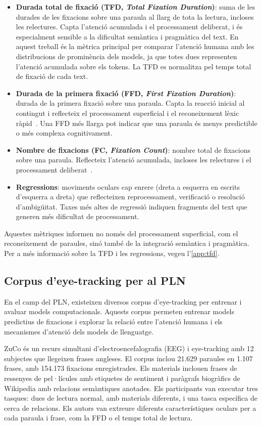 \begin{itemize}
    \item \textbf{Durada total de fixació (TFD, \textit{Total Fixation Duration})}: suma de les durades de les fixacions sobre una paraula al llarg de tota la lectura, incloses les relectures. Capta l'atenció acumulada i el processament deliberat, i és especialment sensible a la dificultat semàntica i pragmàtica del text. En aquest treball és la mètrica principal per comparar l'atenció humana amb les distribucions de prominència dels models, ja que totes dues representen l'atenció acumulada sobre els tokens. La TFD es normalitza pel temps total de fixació de cada text.
    \item \textbf{Durada de la primera fixació (FFD, \textit{First Fixation Duration})}: durada de la primera fixació sobre una paraula. Capta la reacció inicial al contingut i reflecteix el processament superficial i el reconeixement lèxic ràpid~\cite{rayner2009eye}. Una FFD més llarga pot indicar que una paraula és menys predictible o més complexa cognitivament.
    \item \textbf{Nombre de fixacions (FC, \textit{Fixation Count})}: nombre total de fixacions sobre una paraula. Reflecteix l'atenció acumulada, incloses les relectures i el processament deliberat~\cite{rayner2009eye}.
    \item \textbf{Regressions}: moviments oculars cap enrere (dreta a esquerra en escrits d'esquerra a dreta) que reflecteixen reprocessament, verificació o resolució d'ambigüitat. Taxes més altes de regressió indiquen fragments del text que generen més dificultat de processament.
\end{itemize}

Aquestes mètriques informen no només del processament superficial, com el reconeixement de paraules, sinó també de la integració semàntica i pragmàtica. Per a més informació sobre la TFD i les regressions, vegeu l'\autoref{app:tfd}.

\subsection{Corpus d'eye-tracking per al PLN}

En el camp del PLN, existeixen diversos corpus d'eye-tracking per entrenar i avaluar models computacionals.
Aquests corpus permeten entrenar models predictius de fixacions i explorar la relació entre l'atenció humana i els mecanismes d'atenció dels models de llenguatge.

ZuCo \cite{hollenstein_zuco_2018} és un recurs simultani d'electroencefalografia (EEG) i eye-tracking amb 12 subjectes que llegeixen frases angleses.
El corpus inclou 21.629 paraules en 1.107 frases, amb 154.173 fixacions enregistrades.
Els materials inclouen frases de ressenyes de pel·lícules amb etiquetes de sentiment i paràgrafs biogràfics de Wikipedia amb relacions semàntiques anotades.
Els participants van executar tres tasques: dues de lectura normal, amb materials diferents, i una tasca específica de cerca de relacions.
Els autors van extreure diferents característiques oculars per a cada paraula i frase, com la FFD o el temps total de lectura.

